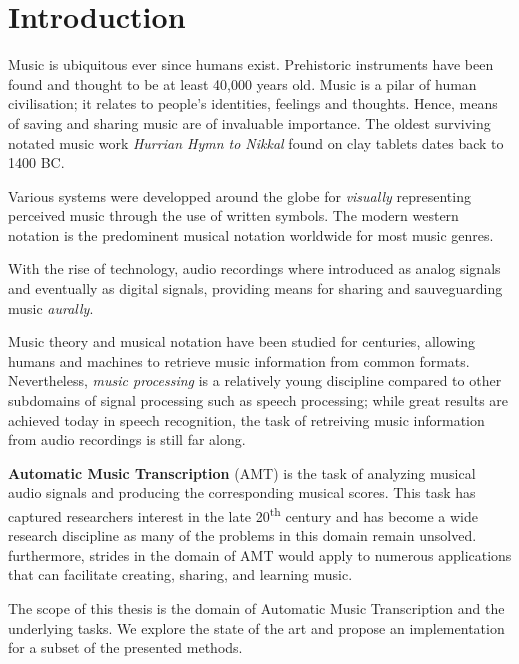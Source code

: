 \documentclass[
  american,
]{article}
\begin{document}
\def\X{\boldsymbol{X}}
\def\V{\boldsymbol{V}}
\def\W{\boldsymbol{W}}
\def\H{\boldsymbol{H}}

\pagebreak

\hypertarget{introduction}{%
\section*{Introduction}\label{introduction}}

Music is ubiquitous ever since humans exist.
Prehistoric instruments have been found and thought to be at least
40,000 years old.
Music is a pilar of human civilisation; it relates to people's identities,
feelings and thoughts.
Hence, means of saving and sharing music are of invaluable importance.
The oldest surviving notated music work \emph{Hurrian Hymn to Nikkal}
found on clay tablets dates back to 1400 BC.

Various systems were developped around the globe for \emph{visually}
representing perceived music through the use of written symbols.
The modern western notation is the predominent musical notation
worldwide for most music genres.

With the rise of technology, audio recordings where introduced
as analog signals and eventually as digital signals,
providing means for sharing and sauveguarding music \emph{aurally}.

Music theory and musical notation have been studied for centuries,
allowing humans and machines to retrieve music information
from common formats.
Nevertheless, \emph{music processing} is a relatively young discipline
compared to other subdomains of signal processing such as speech
processing; while great results are achieved today in speech recognition,
the task of retreiving music information from audio recordings
is still far along.

\textbf{Automatic Music Transcription} (AMT) is the task of analyzing
musical audio signals and producing the corresponding musical scores.
This task has captured researchers interest in the late 20\textsuperscript{th} century
and has become a wide research discipline as many of the problems
in this domain remain unsolved.
furthermore, strides in the domain of AMT would apply to numerous
applications that can facilitate creating, sharing, and learning music.

The scope of this thesis is the domain of Automatic Music Transcription
and the underlying tasks.
We explore the state of the art and propose an implementation
for a subset of the presented methods.
\end{document}
